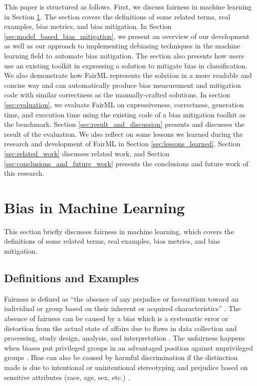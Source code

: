 \documentclass[sigconf]{acmart}
\begin{document}
	This paper is structured as follows. First, we discuss fairness in machine learning in Section \ref{sec:bias_in_machine_learning}. The section covers the definitions of some related terms, real examples, bias metrics, and bias mitigation. In Section \ref{sec:model_based_bias_mitigation}, we present an overview of our development as well as our approach to implementing debiasing techniques in the machine learning field to automate bias mitigation. 
	The section also presents how users use an existing toolkit in expressing a solution to mitigate bias in classification. We also demonstrate how FairML represents the solution in a more readable and concise way and can automatically produce bias measurement and mitigation code with similar correctness as the manually-crafted solutions.
	In section \ref{sec:evaluation}, we evaluate FairML on expressiveness, correctness, generation time, and execution time using the existing code of a bias mitigation toolkit as the benchmark. Section \ref{sec:result_and_discussion} presents and discusses the result of the evaluation. 
	We also reflect on some lessons we learned during the research and development of FairML in Section \ref{sec:lessons_learned}. 
	Section \ref{sec:related_work} discusses related work, and Section \ref{sec:conclusions_and_future_work} presents the conclusions and future work of this research.
	
	\section{Bias in Machine Learning}
	\label{sec:bias_in_machine_learning}
	This section briefly discusses fairness in machine learning, which covers the definitions of some related terms, real examples, bias metrics, and bias mitigation.
	
	\subsection{Definitions and Examples}
	\label{sec:definitions_and_examples}
	
	Fairness is defined as ``the absence of any prejudice or favouritism toward an individual or
	group based on their inherent or acquired characteristics'' \cite{mehrabi2021survey}.
	The absence of fairness can be caused by a bias which is a systematic error or distortion from the actual state of affairs due to flaws in data collection and processing, study design, analysis, and interpretation \cite{oxford2022bias}. 
	The unfairness happens when biases put privileged groups in an advantaged position against unprivileged groups \cite{bellamy2018ai}. 
	Bias can also be caused by harmful discrimination if the distinction made is due to intentional or unintentional stereotyping and prejudice based on sensitive attributes (race, age, sex, etc.) \cite{mehrabi2021survey,chen2019fairness}. 
	
\end{document}
